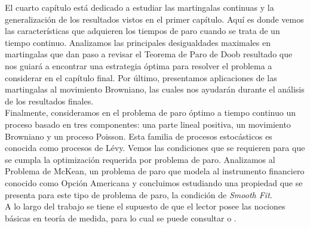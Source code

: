 El cuarto capítulo está dedicado a estudiar las martingalas continuas y la generalización de los resultados vistos en el primer capítulo. Aquí es donde vemos las características que adquieren los tiempos de paro cuando se trata de un tiempo continuo. Analizamos las principales desigualdades maximales en martingalas que dan paso a revisar el Teorema de Paro de Doob resultado que nos guiará a encontrar una estrategia óptima para resolver el problema a considerar en el capítulo final. Por último, presentamos aplicaciones de las martingalas al movimiento Browniano, las cuales nos ayudarán durante el análisis de los resultados finales. \\

Finalmente, consideramos en  el problema de paro óptimo a tiempo continuo un proceso basado en tres componentes: una parte lineal positiva, un movimiento Browniano y un proceso Poisson. Esta familia de procesos estocásticos es conocida como procesos de Lévy. Vemos las condiciones que se requieren para que se cumpla la optimización requerida por problema de paro. Analizamos al Problema de McKean, un problema de paro que modela al instrumento financiero conocido como Opción Americana y concluimos estudiando una propiedad que se presenta para este tipo de problema de paro, la condición de \textit{Smooth Fit}. \\ 

A lo largo del trabajo se tiene el supuesto de que el lector posee las nociones básicas en teoría de medida, para lo cual se puede consultar \cite{jacodprotter} o \cite{shiryaev}. 